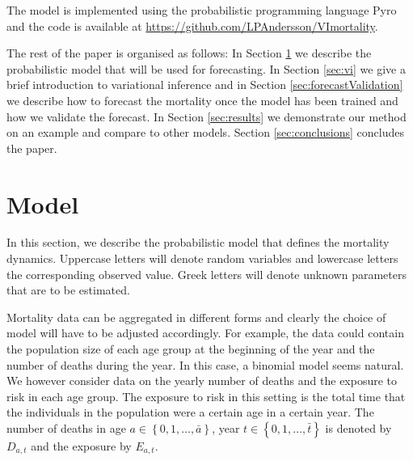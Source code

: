 \documentclass[11pt]{article}
\newcommand{\cur}[1]{\left\{#1\right\}}
\begin{document}
The model is implemented using the probabilistic programming language Pyro \citep{bingham2018pyro} and the code is available at \url{https://github.com/LPAndersson/VImortality}.

The rest of the paper is organised as follows: In Section \ref{sec:model} we describe the probabilistic model that will be used for forecasting. In Section \ref{sec:vi} we give a brief introduction to variational inference and in Section \ref{sec:forecastValidation} we describe how to forecast the mortality once the model has been trained and how we validate the forecast. In Section \ref{sec:results} we demonstrate our method on an example and compare to other models. Section \ref{sec:conclusions} concludes the paper.

\section{Model}\label{sec:model}
In this section, we describe the probabilistic model that defines the mortality dynamics. Uppercase letters will denote random variables and lowercase letters the corresponding observed value. Greek letters will denote unknown parameters that are to be estimated. 

Mortality data can be aggregated in different forms and clearly the choice of model will have to be adjusted accordingly. For example, the data could contain the population size of each age group at the beginning of the year and the number of deaths during the year. In this case, a binomial model seems natural. We however consider data on the yearly number of deaths and the exposure to risk in each age group. The exposure to risk in this setting is the total time that the individuals in the population were a certain age in a certain year.  The number of deaths in age $a\in \cur{0,1,\ldots, \bar a}$, year $t\in \cur{0,1,\ldots, \bar t}$ is denoted by $D_{a,t}$ and the exposure by $E_{a,t}$. 
\end{document}
